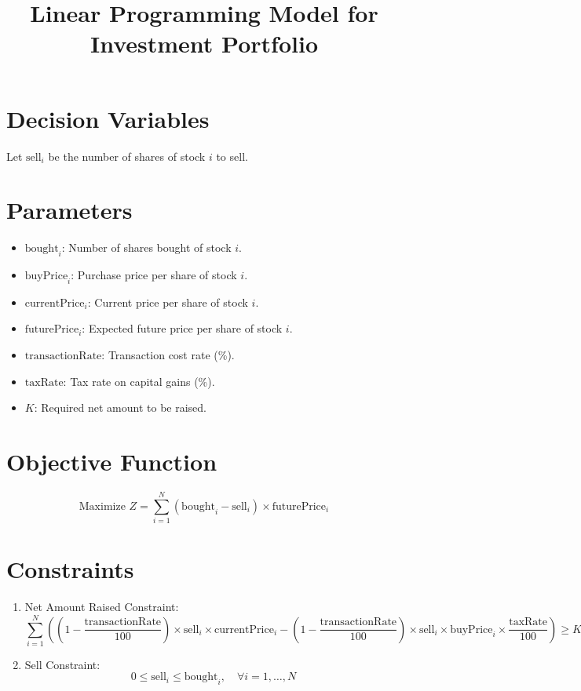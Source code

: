 \documentclass{article}
\begin{document}
\title{Linear Programming Model for Investment Portfolio}
\date{}
\maketitle

\section*{Decision Variables}
Let \( \text{sell}_i \) be the number of shares of stock \( i \) to sell.

\section*{Parameters}
\begin{itemize}
    \item \( \text{bought}_i \): Number of shares bought of stock \( i \).
    \item \( \text{buyPrice}_i \): Purchase price per share of stock \( i \).
    \item \( \text{currentPrice}_i \): Current price per share of stock \( i \).
    \item \( \text{futurePrice}_i \): Expected future price per share of stock \( i \).
    \item \( \text{transactionRate} \): Transaction cost rate (\%).
    \item \( \text{taxRate} \): Tax rate on capital gains (\%).
    \item \( K \): Required net amount to be raised.
\end{itemize}

\section*{Objective Function}
\[
\text{Maximize } Z = \sum_{i=1}^{N} ( \text{bought}_i - \text{sell}_i ) \times \text{futurePrice}_i
\]

\section*{Constraints}
\begin{enumerate}
    \item Net Amount Raised Constraint:
    \[
    \sum_{i=1}^{N} \left( (1 - \frac{\text{transactionRate}}{100}) \times \text{sell}_i \times \text{currentPrice}_i - (1 - \frac{\text{transactionRate}}{100}) \times \text{sell}_i \times \text{buyPrice}_i \times \frac{\text{taxRate}}{100} \right) \geq K
    \]
    \item Sell Constraint:
    \[
    0 \leq \text{sell}_i \leq \text{bought}_i, \quad \forall i = 1, \ldots, N
    \]
\end{enumerate}
\end{document}
